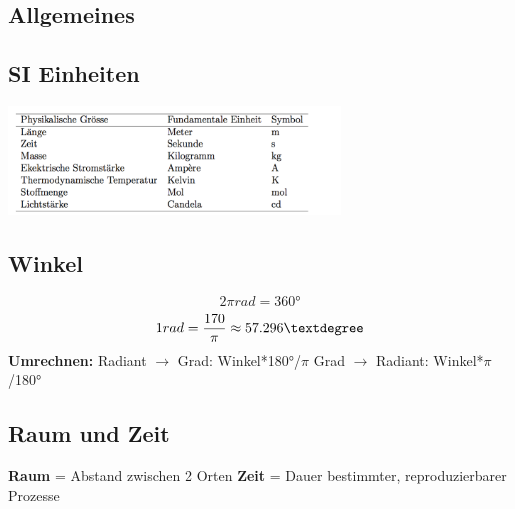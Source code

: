 \documentclass[7pt]{article}
\begin{document}
\begin{multicols*}{3}

\section{Allgemeines}


\subsection{SI Einheiten}

\begin{center}
	\includegraphics[width=250pt]{images/si_einheiten}
\end{center}



\subsection{Winkel}

\begin{equation*}
	2\pi rad = 360°
\end{equation*}
\begin{equation*}
	1 \space rad = \frac{170}{\pi} \approx 57.296°
\end{equation*}
\textbf {Umrechnen:}
\newline Radiant $\rightarrow$ Grad: Winkel*180°/$\pi$ 
\newline Grad $\rightarrow$ Radiant: Winkel*$\pi$/180°

\subsection{Raum und Zeit}

\textbf{Raum} = Abstand zwischen 2 Orten
\newline \textbf{Zeit} = Dauer bestimmter, reproduzierbarer Prozesse

\end{multicols*}
\end{document}
